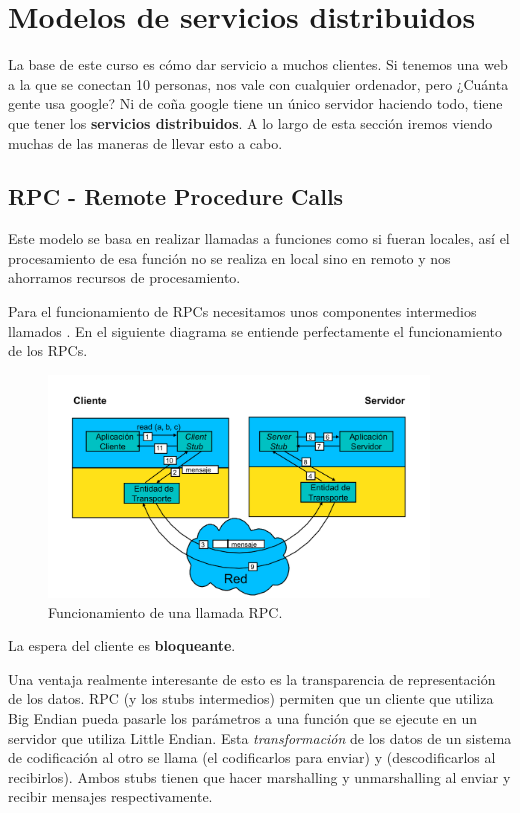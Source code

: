 \documentclass{apuntes}[nochap]
\begin{document}
\section{Modelos de servicios distribuidos}

La base de este curso es cómo dar servicio a muchos clientes. Si tenemos una web a la que se conectan 10 personas, nos vale con cualquier ordenador, pero ¿Cuánta gente usa google? Ni de coña google tiene un único servidor haciendo todo, tiene que tener los \textbf{servicios distribuidos}. A lo largo de esta sección iremos viendo muchas de las maneras de llevar esto a cabo.

\subsection{RPC - Remote Procedure Calls}
Este modelo se basa en realizar llamadas a funciones como si fueran locales, así el procesamiento de esa función no se realiza en local sino en remoto y nos ahorramos recursos de procesamiento.

Para el funcionamiento de RPCs necesitamos unos componentes intermedios llamados . En el siguiente diagrama se entiende perfectamente el funcionamiento de los RPCs.
\begin{figure}[htb]
\centering
\includegraphics[width=0.9\textwidth]{img/RPC.png}
\caption{Funcionamiento de una llamada RPC.}
\label{RPCimg}
\end{figure}
\newpage

\obs La espera del cliente es \textbf{bloqueante}.

\obs Una ventaja realmente interesante de esto es la transparencia de representación de los datos. RPC (y los stubs intermedios) permiten que un cliente que utiliza Big Endian pueda pasarle los parámetros a una función que se ejecute en un servidor que utiliza Little Endian. Esta \textit{transformación} de los datos de un sistema de codificación al otro se llama  (el codificarlos para enviar) y  (descodificarlos al recibirlos). Ambos stubs tienen que hacer marshalling y unmarshalling al enviar y recibir mensajes respectivamente.
\end{document}
